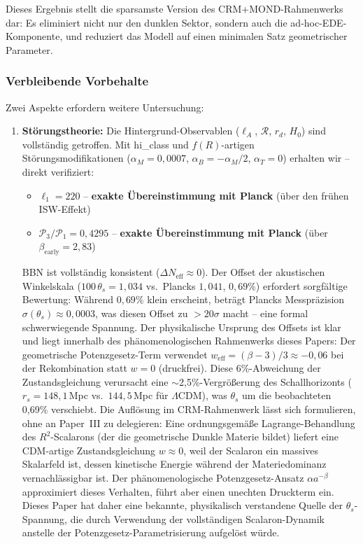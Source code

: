 \documentclass[aps,prd,twocolumn,superscriptaddress,nofootinbib,floatfix]{revtex4-2}
\begin{document}
Dieses Ergebnis stellt die sparsamste Version des CRM+MOND-Rahmenwerks dar: Es eliminiert nicht nur den dunklen Sektor, sondern auch die ad-hoc-EDE-Komponente, und reduziert das Modell auf einen minimalen Satz geometrischer Parameter.

\subsubsection{Verbleibende Vorbehalte}
\label{subsubsec:caveats}

Zwei Aspekte erfordern weitere Untersuchung:
\begin{enumerate}
\item \textbf{Störungstheorie:} Die Hintergrund-Observablen ($\ell_A$, $\mathcal{R}$, $r_d$, $H_0$) sind vollständig getroffen. Mit hi\_class \cite{Zumalacarregui2017} und $f(R)$-artigen Störungsmodifikationen ($\alpha_M = 0{,}0007$, $\alpha_B = -\alpha_M/2$, $\alpha_T = 0$) erhalten wir -- direkt verifiziert:
\begin{itemize}
\item $\ell_1 = 220$ -- \textbf{exakte Übereinstimmung mit Planck} (über den frühen ISW-Effekt)
\item $\mathcal{P}_3/\mathcal{P}_1 = 0{,}4295$ -- \textbf{exakte Übereinstimmung mit Planck} (über $\beta_{\mathrm{early}} = 2{,}83$)
\end{itemize}
BBN ist vollständig konsistent ($\Delta N_{\mathrm{eff}} \approx 0$). Der Offset der akustischen Winkelskala ($100\,\theta_s = 1{,}034$ vs.\ Plancks $1{,}041$, $0{,}69\%$) erfordert sorgfältige Bewertung: Während $0{,}69\%$ klein erscheint, beträgt Plancks Messpräzision $\sigma(\theta_s) \approx 0{,}0003$, was diesen Offset zu $>20\sigma$ macht -- eine formal schwerwiegende Spannung. Der physikalische Ursprung des Offsets ist klar und liegt innerhalb des phänomenologischen Rahmenwerks dieses Papers: Der geometrische Potenzgesetz-Term verwendet $w_{\mathrm{eff}} = (\beta-3)/3 \approx -0{,}06$ bei der Rekombination statt $w = 0$ (druckfrei). Diese 6\%-Abweichung der Zustandsgleichung verursacht eine $\sim$2,5\%-Vergrößerung des Schallhorizonts ($r_s = 148{,}1$\,Mpc vs.\ $144{,}5$\,Mpc für $\Lambda$CDM), was $\theta_s$ um die beobachteten 0,69\% verschiebt. Die Auflösung im CRM-Rahmenwerk lässt sich formulieren, ohne an Paper~III zu delegieren: Eine ordnungsgemäße Lagrange-Behandlung des $R^2$-Scalarons (der die geometrische Dunkle Materie bildet) liefert eine CDM-artige Zustandsgleichung $w \approx 0$, weil der Scalaron ein massives Skalarfeld ist, dessen kinetische Energie während der Materiedominanz vernachlässigbar ist. Der phänomenologische Potenzgesetz-Ansatz $\alpha a^{-\beta}$ approximiert dieses Verhalten, führt aber einen unechten Druckterm ein. Dieses Paper hat daher eine bekannte, physikalisch verstandene Quelle der $\theta_s$-Spannung, die durch Verwendung der vollständigen Scalaron-Dynamik anstelle der Potenzgesetz-Parametrisierung aufgelöst würde.


\end{enumerate}
\end{document}
